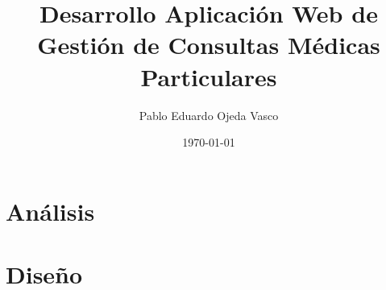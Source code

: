 \documentclass[a4paper,oneside,11pt]{book}
\title{\bf Desarrollo Aplicación Web de Gestión de Consultas Médicas Particulares}
\author{Pablo Eduardo Ojeda Vasco}
\date{\today}
\begin{document}
	\maketitle
	
	\newpage 
	\thispagestyle{empty} 
	
	
	
	\frontmatter

	\tableofcontents
	\listoffigures
	\listoftables
	
	\mainmatter
	
	
	\chapter{Análisis} %
	\label{cha:analisis}
		\newpage
		\newpage
		\newpage
		\newpage
		\newpage
		\newpage
	
	\chapter{Diseño} %
	\label{cha:diseno}
		\newpage
		\newpage
		\newpage
		\newpage
		\newpage
		\newpage
	
	
	

\end{document}
